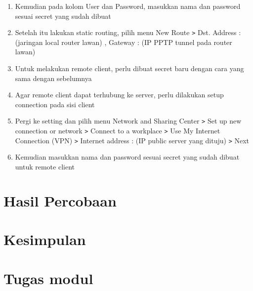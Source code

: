 \begin{enumerate}
    \item Kemudian pada kolom User dan Password, masukkan nama dan password sesuai secret yang sudah dibuat
    \item Setelah itu lakukan static routing, pilih menu New Route \texttt{\text>} Dst. Address : (jaringan local router lawan) , Gateway : (IP PPTP tunnel pada router lawan)
    \item Untuk melakukan remote client, perlu dibuat secret baru dengan cara yang sama dengan sebelumnya
    \item Agar remote client dapat terhubung ke server, perlu dilakukan setup connection pada sisi client
    \item Pergi ke setting dan pilih menu Network and Sharing Center \texttt{\text>} Set up new connection or network \texttt{\text>} Connect to a workplace \texttt{\text>} Use My Internet Connection (VPN) \texttt{\text>} Internet address : (IP public server yang dituju) \texttt{\text>} Next
    \item Kemudian masukkan nama dan password sesuai secret yang sudah dibuat untuk remote client
    
\end{enumerate}

\section{Hasil Percobaan}


\section{Kesimpulan}


\section{Tugas modul}

